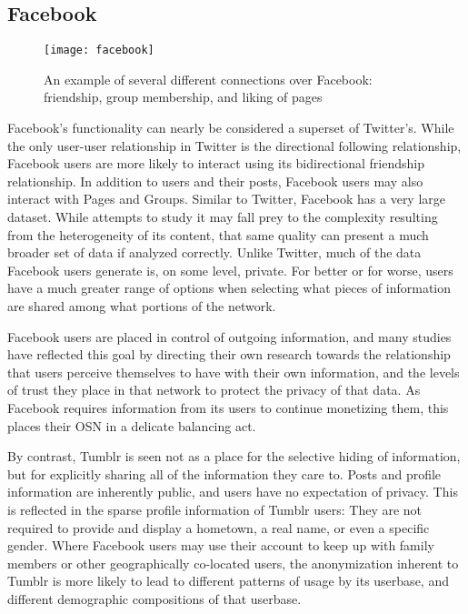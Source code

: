 \subsection{Facebook}
\begin{figure}[bht]
\centering
 \texttt{[image: facebook]}
 \caption{An example of several different connections over Facebook: friendship, group membership, and liking of pages}
 \label{fig:facebook}
\end{figure}
Facebook's functionality can nearly be considered a superset of Twitter's.  
While the only user-user relationship in Twitter is the directional following 
relationship, Facebook users are more likely to interact using its 
bidirectional friendship relationship.  In addition to users and their 
posts, Facebook users may also interact with Pages and Groups.  
Similar to Twitter, Facebook has a very large dataset.  While attempts 
to study it may fall prey to the complexity resulting from the 
heterogeneity of its content, that same quality can present a much 
broader set of data if analyzed correctly.  Unlike Twitter, much of 
the data Facebook users generate is, on some level, private.  For 
better or for worse, users have a much greater range of options when 
selecting what pieces of information are shared among what portions 
of the network.


Facebook users are placed in control of outgoing information, 
and many studies have reflected this goal by directing their own 
research\cite{dwyer2007trust, lipford2008understanding}
towards the relationship that users perceive themselves to have with 
their own information, and the levels of trust they place in that 
network to protect the privacy of that data.  As Facebook requires 
information from its users to continue monetizing them, this places 
their OSN in a delicate balancing act.


By contrast, Tumblr is seen not as a place for the selective hiding of 
information\cite{liu2011analyzing}, but for explicitly sharing all of 
the information they care to.  Posts and profile information are 
inherently public, and users have no expectation of privacy.  This is 
reflected in the sparse profile information of Tumblr users: They are 
not required to provide and display a hometown, a real name, or even a 
specific gender.  Where Facebook users may use their account to keep 
up with family members\cite{joinson2008looking} or other geographically 
co-located users, the anonymization\cite{alexander2002introduction} 
inherent to Tumblr is more likely to lead to different patterns of 
usage by its userbase, and different demographic 
compositions\cite{drager2012trans} of that userbase.  



